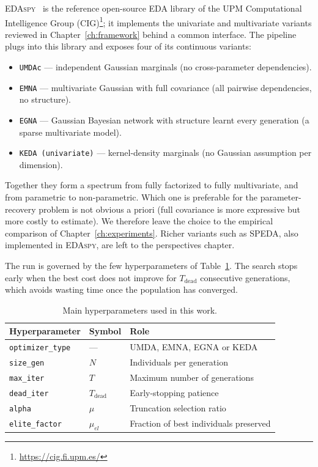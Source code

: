 \textsc{EDAspy}~\cite{soloviev2024edaspy} is the reference open-source
EDA library of the UPM Computational Intelligence
Group (CIG)\footnote{\url{https://cig.fi.upm.es/}}; it implements the univariate and
multivariate variants reviewed in Chapter~\ref{ch:framework} behind a
common interface. The pipeline plugs into this library and exposes
four of its continuous variants:
\begin{itemize}
  \item \texttt{UMDAc} — independent Gaussian marginals (no
        cross-parameter dependencies).
  \item \texttt{EMNA} — multivariate Gaussian with full covariance
        (all pairwise dependencies, no structure).
  \item \texttt{EGNA} — Gaussian Bayesian network with structure
        learnt every generation (a sparse multivariate model).
  \item \texttt{KEDA (univariate)} — kernel-density marginals (no
        Gaussian assumption per dimension).
\end{itemize}
Together they form a spectrum from fully factorized to fully
multivariate, and from parametric to non-parametric. Which one is
preferable for the parameter-recovery problem is not obvious a priori
(full covariance is more expressive but more costly to estimate). We therefore leave the
choice to the empirical comparison of Chapter~\ref{ch:experiments}. Richer variants such
as SPEDA, also implemented in \textsc{EDAspy}, are left to the
perspectives chapter.

The run is governed by the few hyperparameters of
Table~\ref{tab:hyperparams}. The search stops early when the best cost
does not improve for $T_{\text{dead}}$ consecutive generations, which
avoids wasting time once the population has converged.

\begin{table}[h]
\centering\small
\begin{tabular}{lll}
\hline
\textbf{Hyperparameter} & \textbf{Symbol} & \textbf{Role}\\
\hline
\texttt{optimizer\_type} & --- & UMDA, EMNA, EGNA or KEDA\\
\texttt{size\_gen}       & $N$ & Individuals per generation\\
\texttt{max\_iter}       & $T$ & Maximum number of generations\\
\texttt{dead\_iter}      & $T_{\text{dead}}$ & Early-stopping patience\\
\texttt{alpha}           & $\mu$ & Truncation selection ratio\\
\texttt{elite\_factor}   & $\mu_{el}$ & Fraction of best individuals preserved\\
\hline
\end{tabular}
\caption{Main hyperparameters used in this work.}
\label{tab:hyperparams}
\end{table}

